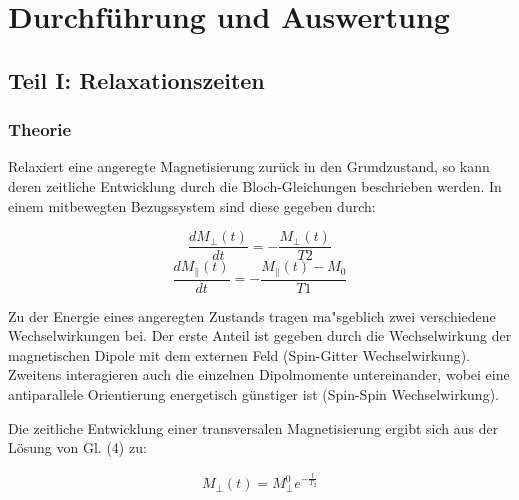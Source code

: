 \documentclass[a4paper]{scrartcl} %
\begin{document}
\section{Durchführung und Auswertung}

\subsection{Teil I: Relaxationszeiten}

\subsubsection{Theorie}

Relaxiert eine angeregte Magnetisierung zurück in den Grundzustand, so kann deren zeitliche Entwicklung durch die Bloch-Gleichungen beschrieben werden. In einem mitbewegten Bezugssystem sind diese gegeben durch:

\begin{equation}
\frac{dM_{\perp}(t)}{dt} = - \frac{M_{\perp}(t)}{T2}
\end{equation}
\begin{equation}
\frac{dM_{\parallel}(t)}{dt} = - \frac{M_{\parallel}(t) - M_0}{T1}
\end{equation}

Zu der Energie eines angeregten Zustands tragen ma"sgeblich zwei verschiedene Wechselwirkungen bei. Der erste Anteil ist gegeben durch die Wechselwirkung der magnetischen Dipole mit dem externen Feld (Spin-Gitter Wechselwirkung). Zweitens interagieren auch die einzelnen Dipolmomente untereinander, wobei eine antiparallele Orientierung energetisch günstiger ist (Spin-Spin Wechselwirkung).

Die zeitliche Entwicklung einer transversalen Magnetisierung ergibt sich aus der Lösung von Gl. (4) zu:

\begin{equation}
M_{\perp}(t) = M_{\perp}^0 e^{-\frac{t}{T_2}}
\end{equation}
\end{document}
